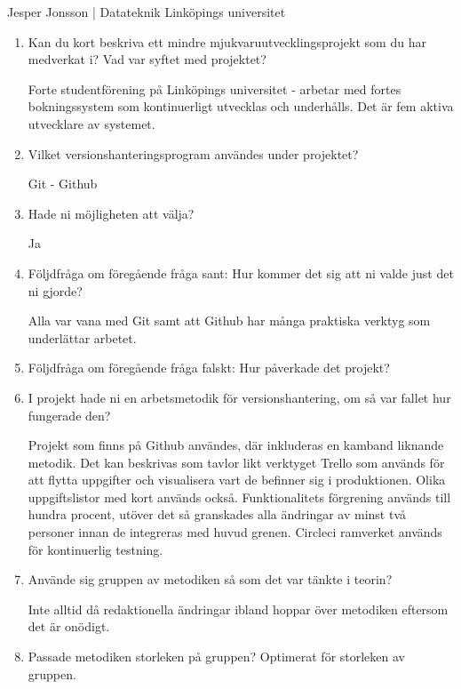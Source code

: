 \vspace{3em}
\begin{center}
    Jesper Jonsson | Datateknik Linköpings universitet
\end{center}
\begin{enumerate}

  \item Kan du kort beskriva ett mindre mjukvaruutvecklingsprojekt som du har medverkat i? Vad var syftet med projektet?

  Forte studentförening på Linköpings universitet - arbetar med fortes bokningssystem som kontinuerligt utvecklas och underhålls. Det är fem aktiva utvecklare av systemet.

  \item Vilket versionshanteringsprogram användes under projektet?

  Git - Github

  \item Hade ni möjligheten att välja?

  Ja

  \item Följdfråga om föregående fråga sant: Hur kommer det sig att ni valde just det ni gjorde?

  Alla var vana med Git samt att Github har många praktiska verktyg som underlättar arbetet.

  \item Följdfråga om föregående fråga falskt: Hur påverkade det projekt?

  \item I projekt hade ni en arbetsmetodik för versionshantering, om så var fallet hur fungerade den?

  Projekt som finns på Github användes, där inkluderas en kamband liknande metodik. Det kan beskrivas som tavlor likt verktyget Trello som används för att flytta uppgifter och visualisera vart de befinner sig i produktionen. Olika uppgiftslistor med kort används också. Funktionalitets förgrening används till hundra procent, utöver det så granskades alla ändringar av minst två personer innan de integreras med huvud grenen. Circleci ramverket används för kontinuerlig testning.

  \item Använde sig gruppen av metodiken så som det var tänkte i teorin?

  Inte alltid då redaktionella ändringar ibland hoppar över metodiken eftersom det är onödigt.

  \item Passade metodiken storleken på gruppen?
  Optimerat för storleken av gruppen.


\end{enumerate}
